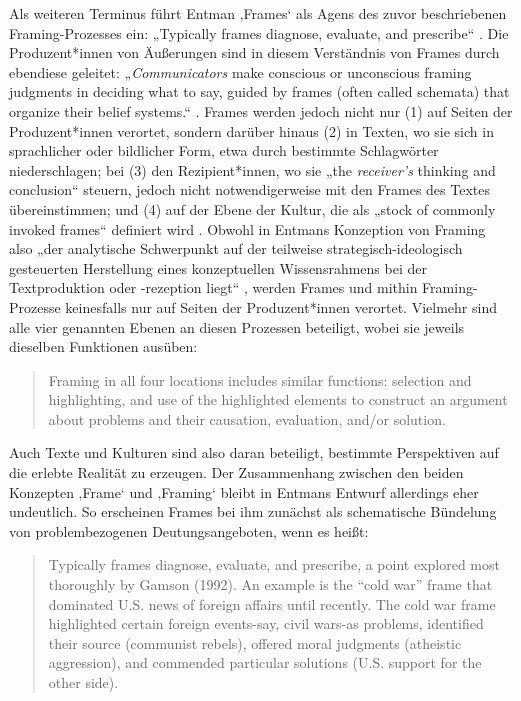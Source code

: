 Als weiteren Terminus führt Entman ‚Frames` als Agens des zuvor beschriebenen Framing-Prozesses ein: „Typically frames diagnose, evaluate, and prescribe`` \autocite*[52]{entmanFramingClarificationFractured1993}. Die Produzent*innen von Äußerungen sind in diesem Verständnis von Frames durch ebendiese geleitet: „\emph{Communicators} make conscious or unconscious framing judgments in deciding what to say, guided by frames (often called schemata) that organize their belief systems.`` \autocite[52]{entmanFramingClarificationFractured1993}. Frames werden jedoch nicht nur (1) auf Seiten der Produzent*innen verortet, sondern darüber hinaus (2) in Texten, wo sie sich in sprachlicher oder bildlicher Form, etwa durch bestimmte Schlagwörter niederschlagen; bei (3) den Rezipient*innen, wo sie „the \emph{receiver's} thinking and conclusion`` steuern, jedoch nicht notwendigerweise mit den Frames des Textes übereinstimmen; und (4) auf der Ebene der Kultur, die als „stock of commonly invoked frames`` definiert wird \autocite[52-53]{entmanFramingClarificationFractured1993}. Obwohl in Entmans Konzeption von Framing also „der analytische Schwerpunkt auf der teilweise strategisch-ideologisch gesteuerten Herstellung eines konzeptuellen Wissensrahmens bei der Textproduktion oder -rezeption liegt`` \autocite[147]{ziemFramesAlsPraedikations2014}, werden Frames und mithin Framing-Prozesse keinesfalls nur auf Seiten der Produzent*innen verortet. Vielmehr sind alle vier genannten Ebenen an diesen Prozessen beteiligt, wobei sie jeweils dieselben Funktionen ausüben:

\begin{quote}
Framing in all four locations includes similar functions: selection and highlighting, and use of the highlighted elements to construct an argument about problems and their causation, evaluation, and/or solution. \autocite[53]{entmanFramingClarificationFractured1993}
\end{quote}

Auch Texte und Kulturen sind also daran beteiligt, bestimmte Perspektiven auf die erlebte Realität zu erzeugen. Der Zusammenhang zwischen den beiden Konzepten ‚Frame` und ‚Framing` bleibt in Entmans Entwurf allerdings eher undeutlich. So erscheinen Frames bei ihm zunächst als schematische Bündelung von problembezogenen Deutungsangeboten, wenn es heißt:

\begin{quote}
Typically frames diagnose, evaluate, and prescribe, a point explored most thoroughly by Gamson (1992). An example is the ``cold war'' frame that dominated U.S. news of foreign affairs until recently. The cold war frame highlighted certain foreign events-say, civil wars-as problems, identified their source (communist rebels), offered moral judgments (atheistic aggression), and commended particular solutions (U.S. support for the other side). \autocite[52]{entmanFramingClarificationFractured1993}
\end{quote}

